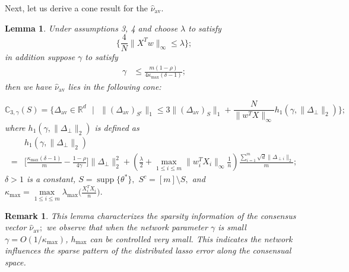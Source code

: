 \documentclass{article}
\theoremstyle{break}
\newtheorem{lemma}[theorem]{Lemma}
\newtheorem*{remark}{Remark}
\newcommand{\T}{\theta}
\DeclareMathOperator\supp{supp}
\begin{document}
Next, let us derive a cone result for the $\hat{\nu}_{\text{av}}.$
\begin{lemma}\label{proximal nu average sparsity}
Under assumptions 3, 4 and 
choose $\lambda$ to satisfy
  \begin{equation}\label{distributed lambda}
      \{\frac{4}{N}\lVert X^T w\rVert_{\infty}\leq \lambda\}; 
  \end{equation}
 in addition suppose $\gamma$ to satisfy 
\begin{align}\label{proximal deterministic gamma}
    \gamma&\leq \frac{m(1-\rho)}{4\kappa_{\max}(\delta-1)};
\end{align}
then we have $\hat{\nu}_{\text{av}}$ lies in the following cone:

\begin{equation}\label{nu ave sparsity}
    \mathbb{C}_{3,\gamma}(S)=\bigg\{\Delta_{
    \text{av}}\in\mathbb{R}^d\text{ }|\text{ }\lVert(\Delta_{\text{av}})_{S^c}\rVert_1\leq 3\lVert(\Delta_{\text{av}})_{S}\rVert_1+\frac{N}{\lVert w^TX\rVert_{\infty}} h_{1}(\gamma,\lVert\Delta_{\perp}\rVert_2)\bigg\};
\end{equation}
where $h_{1}(\gamma,\lVert\Delta_{\perp}\rVert_2)$ is defined as 
\begin{align}\label{h 1}
  &h_{1}(\gamma,\lVert\Delta_{\perp}\rVert_2)\\
  =& \bigg[\frac{\kappa_{\max}(\delta-1)}{m}-\frac{1-\rho}{4\gamma}\bigg]\lVert\Delta_{\perp}\rVert_2^2+(\frac{\lambda}{2}+\max\limits_{1\leq i\leq m}\lVert w_i^T X_i\rVert_{\infty}\frac{1}{n})\frac{\sum\limits_{i=1}^m\sqrt{d}\lVert\Delta_{\perp i}\rVert_2}{m};
\end{align}
$\delta>1$ is a constant, $S=\supp\{\T^*\},$ $S^c=[m]\setminus S,$ and $\kappa_{\max}=\max\limits_{1\leq i\leq m}\lambda_{\max}\bigg(\frac{X_i^T X_i}{n}\bigg).$
\end{lemma}
\begin{remark}
This lemma characterizes the sparsity information of the consensus  vector $\hat{\nu}_{
\text{av}};$ 
we observe that when the network parameter $\gamma$ is small $\gamma=O(1/\kappa_{\max})$, $h_{\max}$ can be controlled very small. This indicates the network  influences the sparse pattern of the distributed lasso error along the consensual space.
\end{remark}
\end{document}
